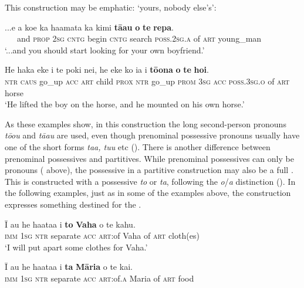 This construction may be emphatic: ‘yours, nobody else’s’:

\ea\label{ex:6.19}
\gll ...{\ꞌ}e a koe ka ha{\ꞌ}amata ka kimi \textbf{tā{\ꞌ}au} \textbf{o} \textbf{te} \textbf{repa}. \\
~~~and \textsc{prop} \textsc{2sg} \textsc{cntg} begin \textsc{cntg} search \textsc{poss.2sg.a} of \textsc{art} young\_man \\

\glt 
‘...and you should start looking for your own boyfriend.’ \textstyleExampleref{[R315.258]} 
\z

\ea\label{ex:6.20}
\gll He haka eke i te poki nei, he eke ko ia i \textbf{tō{\ꞌ}ona} \textbf{o} \textbf{te} \textbf{hoi}. \\
\textsc{ntr} \textsc{caus} go\_up \textsc{acc} \textsc{art} child \textsc{prox} \textsc{ntr} go\_up \textsc{prom} \textsc{3sg} \textsc{acc} \textsc{poss.3sg.o} of \textsc{art} horse \\

\glt 
‘He lifted the boy on the horse, and he mounted on his own horse.’ \textstyleExampleref{[R105.028]} 
\z

As these examples show, in this construction the long second-person pronouns \textit{tō{\ꞌ}ou} and \textit{tā{\ꞌ}au} are used, even though prenominal possessive pronouns usually have one of the short forms \textit{ta{\ꞌ}a, tu{\ꞌ}u} etc (). There is another difference between prenominal possessives and partitives. While prenominal possessives can only be pronouns ( above), the possessive in a partitive construction may also be a full . This  is constructed with a possessive  \textit{to} or \textit{ta}, following the \textit{o}/\textit{a} distinction (). In the following examples, just as in some of the examples above, the construction expresses something destined for the .

\ea\label{ex:6.21}
\gll {\ꞌ}Ī au he ha{\ꞌ}ata{\ꞌ}a i \textbf{to} \textbf{Vaha} o te kahu. \\
\textsc{imm} \textsc{1sg} \textsc{ntr} separate \textsc{acc} \textsc{art}:of Vaha of \textsc{art} cloth(es) \\

\glt 
‘I will put apart some clothes for Vaha.’ \textstyleExampleref{[R229.194]} 
\z

\ea\label{ex:6.22}
\gll {\ꞌ}Ī au he ha{\ꞌ}ata{\ꞌ}a i \textbf{ta} \textbf{Māria} o te kai. \\
\textsc{imm} \textsc{1sg} \textsc{ntr} separate \textsc{acc} \textsc{art}:of\textsc{.a} Maria of \textsc{art} food \\

